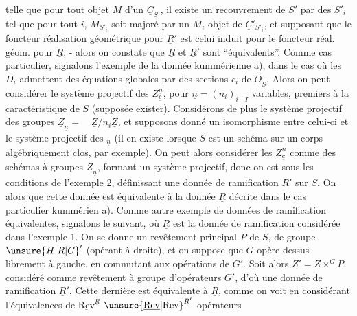 telle que pour tout objet $M$ d'un $\underline{C}_{S'}$, il existe un recouvrement de $S'$ par des $S'_i$ tel que pour tout $i$, $M_{S'_i}$ soit  majoré par un $M_i$ objet de $\underline{C}'_{S'_i}$,  et supposant que le foncteur réalisation géométrique pour $\underline{R}'$ est celui induit pour le foncteur réal. géom. pour $\underline{R}$, - alors on constate que $\underline{R}$ et $\underline{R}'$ sont ``équivalents''. Comme cas particulier, signalons l'exemple de la donnée kummérienne a), dans le cas où les $D_i$ admettent des équations globales par des sections $c_i$ de $\underline{O}_S$. Alors on peut considérer le système projectif des $Z_{\underline{c}}^{\underline{n}}$, pour $\underline{n}=(n_i)_{i\quad I}$ variables, premiers  à la caractéristique de $S$ (supposée exister). Considérons de plus le système projectif des groupes $\underline{Z}_{\underline{n}}=\quad\underline{Z}/n_i\underline{Z}$, et supposons donné un isomorphisme entre celui-ci et le système projectif des ${}_{\underline{n}}$ (il en existe lorsque $S$ est un schéma sur un corps algébriquement clos, par exemple). On peut alors considérer les $Z_{\underline{c}}^{\underline{n}}$ comme des schémas à groupes $\underline{Z}_{\underline{n}}$, formant un système projectif,  donc on est sous les conditions de l'exemple 2, définissant une donnée de ramification $\underline{R}'$ sur $S$. On  alors que cette donnée est équivalente à la donnée $\underline{R}$ décrite dans le cas particulier kummérien a). Comme autre exemple de données de ramification équivalentes\deleted{\unsure{:|;}}, signalons le suivant, où $\underline{R}$ est la donnée de ramification considérée dans l'exemple 1. On se donne un revêtement principal $P$ de $S$, de groupe ${\unsure{H|R|G}}'$ (opérant à droite), et on suppose que $G$ opère dessus librement à gauche, en commutant aux opérations de $G'$. Soit alors $Z'=Z\times^{G}P$, considéré comme revêtement à groupe d'opérateurs $G'$, d'où une donnée de ramification $\underline{R}'$. Cette dernière est équivalente à $\underline{R}$, comme on voit en considérant l'équivalences  de   $\underline{\mathrm{Rev}}^{\underline{R}}$  ${\unsure{\underline{\mathrm{Rev}}|\mathrm{Rev}}}^{R'}$ opérateurs 
